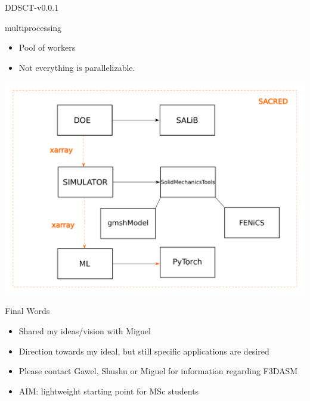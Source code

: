\documentclass[aspectratio=169]{beamer}
\begin{document}
\begin{frame}{DDSCT-v0.0.1}
  \begin{minipage}{0.5\textwidth}
    \begin{block}{\color{White} multiprocessing}
  \begin{itemize}
    \item Pool of workers
    \item Not everything is parallelizable.
  \end{itemize}
    \end{block}
  \end{minipage}%
  \begin{minipage}{0.5\textwidth}
    \includegraphics[width=\textwidth]{Figures/DDSCT-flow.pdf}
  \end{minipage}
\end{frame}

\begin{frame}{Final Words}
  \centering
  \begin{itemize}
    \item Shared my ideas/vision with Miguel
    \item Direction towards my ideal, but still specific applications are desired
    \item Please contact Gawel, Shushu or Miguel for information regarding F3DASM
    \item AIM: lightweight starting point for MSc students
  \end{itemize}
\end{frame}

\begin{frame}
  \centering
  \color{Pink}{What are the tools that you think: "Thank god, this exists!!!"?}
\end{frame}
\end{document}
